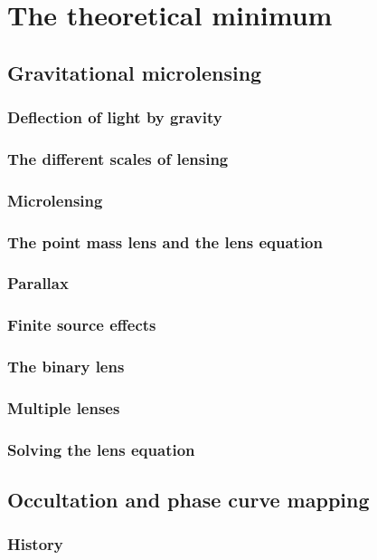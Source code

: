 \documentclass[]{report}
\begin{document}
\chapter{The theoretical minimum}

\section{Gravitational microlensing}
\subsection{Deflection of light by gravity}
\subsection{The different scales of lensing}
\subsection{Microlensing}
\subsection{The point mass lens and the lens equation}
\subsection{Parallax}
\subsection{Finite source effects}
\subsection{The binary lens}
\subsection{Multiple lenses}
\subsection{Solving the lens equation}

\section{Occultation and phase curve mapping}
\subsection{History}
\end{document}
